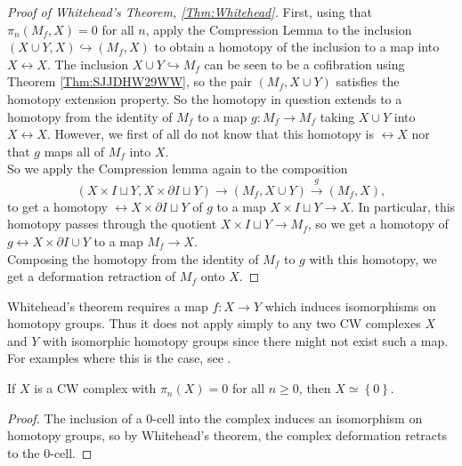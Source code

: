 \begin{proof}[Proof of Whitehead's Theorem, \ref{Thm:Whitehead}]
    First, using that 
    $\pi_n \left( M_f, X \right) = 0$ for all $n$, 
    apply the Compression Lemma to
    the inclusion $ \left( X \cup  Y, X \right) 
    \hookrightarrow \left( M_f, X \right) $ to
    obtain a homotopy of the
    inclusion to a map into $X \rel X$.
    The inclusion $X \cup Y \hookrightarrow M_f$ can be
    seen to be a cofibration using 
    Theorem \ref{Thm:SJJDHW29WW}, so
    the pair $\left( M_f, X \cup Y \right) $ satisfies the
    homotopy extension property. So the
    homotopy in question extends to a homotopy
    from the identity of $M_f$ to a
    map $g \colon M_f \to M_f$ taking 
    $X \cup Y$ into $X \rel X$. 
    However, we first of all do not know that this
    homotopy is $\rel X$ nor that 
    $g$ maps all of $M_f$ into $X$.\\
    So we apply the
    Compression lemma again to the
    composition
     \[
         \left( X \times I \sqcup Y,
         X \times \partial I \sqcup Y\right) 
         \to \left( M_f, X \cup Y \right) 
         \stackrel{g}{\to} \left( M_f,X \right) ,
    \]
    to get a homotopy
    $\rel X \times \partial I \sqcup Y$ of
    $g$ to a map 
    $X \times I \sqcup Y \to X$. In particular,
    this homotopy passes through the quotient
    $X \times I \sqcup Y \to M_f$, so we
    get a homotopy of $g \rel X \times \partial I \cup Y$
    to a map $M_f \to X$.\\
    Composing the homotopy
    from the identity of $M_f$ to $g$ with this homotopy,
    we get a deformation retraction of
    $M_f$ onto $X$.
\end{proof}

\begin{note}
    Whitehead's theorem requires a map
    $f \colon X \to Y$ which induces isomorphisms
    on homotopy groups. Thus it does not apply simply
    to any two CW complexes $X$ and $Y$ with isomorphic
    homotopy groups since there might not exist such a map.
    For examples where this is the case, see
    \cite[p. 348]{Hatcher}.
\end{note}

\begin{corollary}
    If $X$ is a CW complex with
    $\pi_n(X) = 0$ for all $n\ge 0$, then
    $X \simeq \left\{ 0 \right\} $.
\end{corollary}

\begin{proof}
    The inclusion of a $0$-cell into the complex
    induces an isomorphism on homotopy
    groups, so by Whitehead's theorem, the complex deformation
    retracts to the $0$-cell.
\end{proof}


